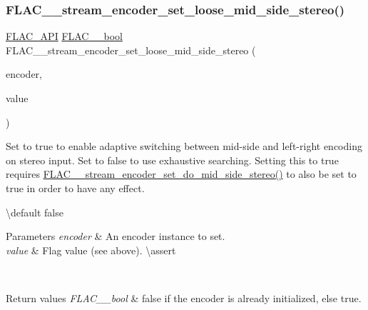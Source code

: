 \subsubsection{\texorpdfstring{FLAC\_\_stream\_encoder\_set\_loose\_mid\_side\_stereo()}{FLAC\_\_stream\_encoder\_set\_loose\_mid\_side\_stereo()}}
{\footnotesize\ttfamily \mbox{\hyperlink{group__flac__export_ga56ca07df8a23310707732b1c0007d6f5}{F\+L\+A\+C\+\_\+\+A\+PI}} \mbox{\hyperlink{ordinals_8h_a95103469f1cbd78b8cf250194985b34e}{F\+L\+A\+C\+\_\+\+\_\+bool}} F\+L\+A\+C\+\_\+\+\_\+stream\+\_\+encoder\+\_\+set\+\_\+loose\+\_\+mid\+\_\+side\+\_\+stereo (\begin{DoxyParamCaption}\item[{\mbox{\hyperlink{struct_f_l_a_c_____stream_encoder}{F\+L\+A\+C\+\_\+\+\_\+\+Stream\+Encoder}} $\ast$}]{encoder,  }\item[{\mbox{\hyperlink{ordinals_8h_a95103469f1cbd78b8cf250194985b34e}{F\+L\+A\+C\+\_\+\+\_\+bool}}}]{value }\end{DoxyParamCaption})}

Set to {\ttfamily true} to enable adaptive switching between mid-\/side and left-\/right encoding on stereo input. Set to {\ttfamily false} to use exhaustive searching. Setting this to {\ttfamily true} requires \mbox{\hyperlink{group__flac__stream__encoder_gadbd1084da109cf0ddd007a5c64027504}{F\+L\+A\+C\+\_\+\+\_\+stream\+\_\+encoder\+\_\+set\+\_\+do\+\_\+mid\+\_\+side\+\_\+stereo()}} to also be set to {\ttfamily true} in order to have any effect.

\textbackslash{}default {\ttfamily false} 
\begin{DoxyParams}{Parameters}
{\em encoder} & An encoder instance to set. \\
\hline
{\em value} & Flag value (see above). \textbackslash{}assert 
\begin{DoxyCode}{1}
\end{DoxyCode}
 \\
\hline
\end{DoxyParams}

\begin{DoxyRetVals}{Return values}
{\em F\+L\+A\+C\+\_\+\+\_\+bool} & {\ttfamily false} if the encoder is already initialized, else {\ttfamily true}. \\
\hline
\end{DoxyRetVals}
\mbox{\label{group__flac__stream__encoder_gac3bde5abdaa340674c5659e2e85d2611}} 
